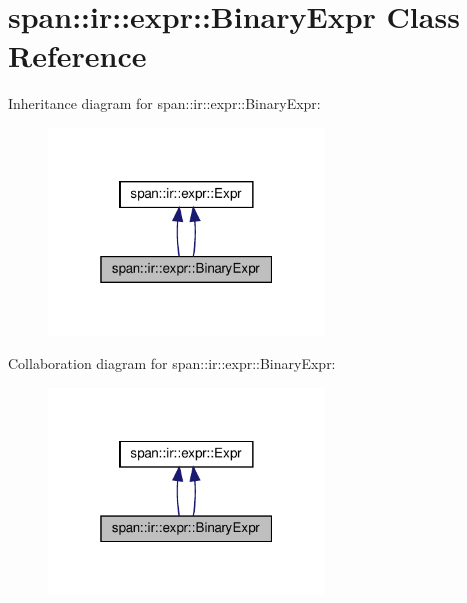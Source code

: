 \hypertarget{classspan_1_1ir_1_1expr_1_1BinaryExpr}{}\section{span\+:\+:ir\+:\+:expr\+:\+:Binary\+Expr Class Reference}
\label{classspan_1_1ir_1_1expr_1_1BinaryExpr}


Inheritance diagram for span\+:\+:ir\+:\+:expr\+:\+:Binary\+Expr\+:\nopagebreak
\begin{figure}[H]
\begin{center}
\leavevmode
\includegraphics[width=208pt]{classspan_1_1ir_1_1expr_1_1BinaryExpr__inherit__graph}
\end{center}
\end{figure}


Collaboration diagram for span\+:\+:ir\+:\+:expr\+:\+:Binary\+Expr\+:\nopagebreak
\begin{figure}[H]
\begin{center}
\leavevmode
\includegraphics[width=208pt]{classspan_1_1ir_1_1expr_1_1BinaryExpr__coll__graph}
\end{center}
\end{figure}
